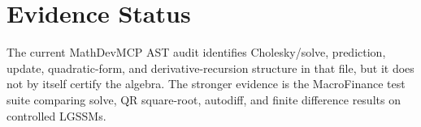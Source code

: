 \section{Evidence Status}
\label{sec:bf-score-evidence-status}

The current MathDevMCP AST audit identifies Cholesky/solve, prediction, update,
quadratic-form, and derivative-recursion structure in that file, but it does
not by itself certify the algebra.  The stronger evidence is the
MacroFinance test suite comparing solve, QR square-root, autodiff, and finite
difference results on controlled LGSSMs.

